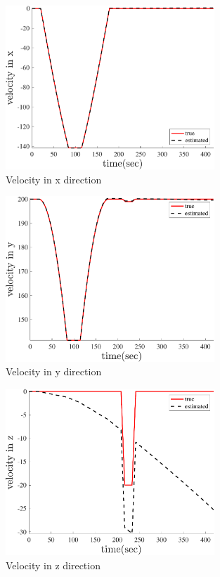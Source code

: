     \begin{figure}[H]
        \centering
        \includegraphics[width=0.7\textwidth]{../Figure/Q5/velocity_x_cos}
        \caption{Velocity in x direction}
    \end{figure}
    \begin{figure}[H]
        \centering
        \includegraphics[width=0.7\textwidth]{../Figure/Q5/velocity_y_cos}
        \caption{Velocity in y direction}
    \end{figure}
    \begin{figure}[H]
        \centering
        \includegraphics[width=0.7\textwidth]{../Figure/Q5/velocity_z_cos}
        \caption{Velocity in z direction}
    \end{figure}
    
